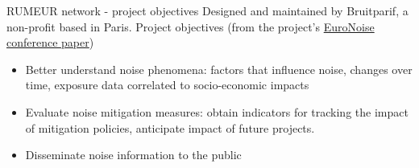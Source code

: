 \documentclass{beamer}
\newcommand{\myhref}[2]{{\color{blue}\href{#1}{#2}}}
\begin{document}
    \begin{frame}{RUMEUR network - project objectives} 
        Designed and maintained by Bruitparif, a non-profit based in Paris. Project objectives (from the project's \myhref{http://www.conforg.fr/euronoise2015/proceedings/data/articles/000043.pdf}{EuroNoise conference paper})  
        \begin{itemize}
            \item Better understand noise phenomena: factors that influence noise, changes over time, exposure data correlated to socio-economic impacts
            \item Evaluate noise mitigation measures: obtain indicators for tracking the impact of mitigation policies, anticipate impact of future projects.
            \item Disseminate noise information to the public
        \end{itemize}
     \end{frame} 
     
\end{document}

